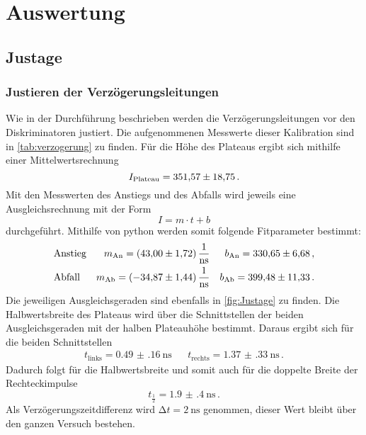 \section{Auswertung}
\label{sec:Auswertung}

\subsection{Justage}
  \subsubsection{Justieren der Verzögerungsleitungen}
    Wie in der Durchführung beschrieben werden die Verzögerungsleitungen vor den Diskriminatoren justiert. 
    Die aufgenommenen Messwerte dieser Kalibration sind in \autoref{tab:verzogerung} zu finden.
    Für die Höhe des Plateaus ergibt sich mithilfe einer Mittelwertsrechnung
    \begin{equation*}
      I_\text{Plateau} = \num{351.57 \pm 18.75} \, .
    \end{equation*}
    Mit den Messwerten des Anstiegs und des Abfalls wird jeweils eine Ausgleichsrechnung mit der Form
    \begin{equation*}
      I = m \cdot t + b
    \end{equation*}
    durchgeführt.
    Mithilfe von python werden somit folgende Fitparameter bestimmt:
    \begin{align*}
      &\text{Anstieg} &m_\text{An}=\SI{43.00 \pm 1.72}{\per\nano\second}   &&b_\text{An}= \num{330.65 \pm 6.68} \, ,\\
      &\text{Abfall}  &m_\text{Ab}= \SI{-34.87 \pm 1.44}{\per\nano\second}  &&b_\text{Ab}= \num{399.48 \pm 11.33} \, .
    \end{align*}
    Die jeweiligen Ausgleichsgeraden sind ebenfalls in \autoref{fig:Justage} zu finden.
    Die Halbwertsbreite des Plateaus wird über die Schnittstellen der beiden Ausgleichsgeraden mit der halben Plateauhöhe bestimmt.
    Daraus ergibt sich für die beiden Schnittstellen
    \begin{align*}
      t_\text{links} = \SI{0.49(16)}{\nano\second} && t_\text{rechts}= \SI{1.37(33)}{\nano\second} \, .
    \end{align*}
    Dadurch folgt für die Halbwertsbreite und somit auch für die doppelte Breite der Rechteckimpulse
    \begin{equation*}
      t_\frac{1}{2} = \SI{1.9(4)}{\nano\second} \, .
    \end{equation*}
    Als Verzögerungszeitdifferenz wird $\increment t = \SI{2}{\nano\second}$ genommen, dieser Wert bleibt über den ganzen Versuch bestehen.
